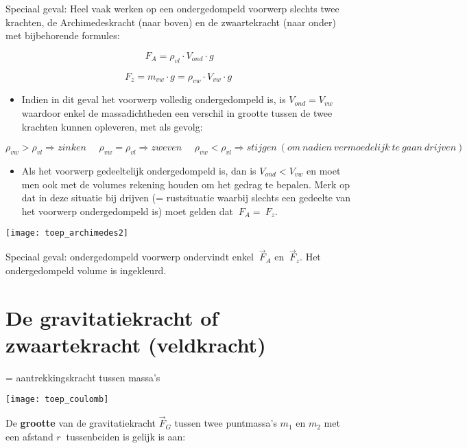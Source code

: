 \documentclass{ximera}
\newcommand{\ul}[1]{#1}
\begin{document}
Speciaal geval: Heel vaak werken op een ondergedompeld voorwerp slechts twee krachten, de Archimedeskracht (naar boven) en de zwaartekracht (naar onder) met bijbehorende formules:

\[{\ F}_{A} = \rho_{vl} \cdot V_{ond} \cdot g \]

\[ F_z = m_{vw} \cdot g = \rho_{vw} \cdot V_{vw} \cdot g \]

\begin{itemize}
\item
  Indien in dit geval het voorwerp \ul{volledig ondergedompeld} is, is
  \(V_{ond} = V_{vw}\) waardoor enkel de massadichtheden een verschil in
  grootte tussen de twee krachten kunnen opleveren, met als gevolg:
\end{itemize}

\[\rho_{vw} > \rho_{vl}\overset{}{\Rightarrow}zinken\ \ \ \ \ \ \rho_{vw} = \rho_{vl}\overset{}{\Rightarrow}zweven\ \ \ \ \ \ \rho_{vw} < \rho_{vl}\overset{}{\Rightarrow}stijgen\ (om\ nadien\ vermoedelijk\ te\ gaan\ drijven)\]

\begin{itemize}
\item
  Als het voorwerp \ul{gedeeltelijk ondergedompeld} is, dan is
  \(V_{ond} < V_{vw}\) en moet men ook met de volumes rekening houden om
  het gedrag te bepalen. Merk op dat in deze situatie bij drijven (=
  rustsituatie waarbij slechts een gedeelte van het voorwerp
  ondergedompeld is) moet gelden dat \({\ F}_{A} = {\ F}_{z}\).
\end{itemize}

\begin{image}
\texttt{[image: toep\_archimedes2]}
\end{image}


Speciaal geval: ondergedompeld voorwerp ondervindt enkel \({\ \overrightarrow{F}}_{A}\) en \({\ \overrightarrow{F}}_{z}\). 
Het ondergedompeld volume is ingekleurd.

\section*{De gravitatiekracht of zwaartekracht (veldkracht)}

= aantrekkingskracht tussen massa's

\begin{image}
  \texttt{[image: toep\_coulomb]}
\end{image}

De \textbf{grootte} van de gravitatiekracht \({\overrightarrow{F}}_{G}\) tussen twee puntmassa's \(m_{1}\) en \(m_{2}\) met een afstand \(r\ \) tussenbeiden is gelijk is aan:
\end{document}
